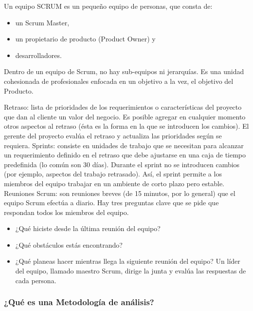 \documentclass[spanish, 12pt]{article}
\providecommand{\tightlist}{\setlength{\itemsep}{0pt}
\setlength{\parskip}{0pt}}
\begin{document}
	Un equipo SCRUM es un pequeño equipo de personas, que consta de:

	\begin{itemize}
		\tightlist

		\item un Scrum Master,

		\item un propietario de producto (Product Owner) y

		\item desarrolladores.
	\end{itemize}

	Dentro de un equipo de Scrum, no hay sub-equipos ni jerarquías. Es una unidad
	cohesionada de profesionales enfocada en un objetivo a la vez, el objetivo del
	Producto.

	Retraso: lista de prioridades de los requerimientos o características del
	proyecto que dan al cliente un valor del negocio. Es posible agregar en cualquier
	momento otros aspectos al retraso (ésta es la forma en la que se introducen
	los cambios). El gerente del proyecto evalúa el retraso y actualiza las
	prioridades según se requiera. Sprints: consiste en unidades de trabajo que se
	necesitan para alcanzar un requerimiento definido en el retraso que debe
	ajustarse en una caja de tiempo predefinida (lo común son 30 días). Durante el
	sprint no se introducen cambios (por ejemplo, aspectos del trabajo retrasado).
	Así, el sprint permite a los miembros del equipo trabajar en un ambiente de
	corto plazo pero estable. Reuniones Scrum: son reuniones breves (de 15 minutos,
	por lo general) que el equipo Scrum efectúa a diario. Hay tres preguntas clave
	que se pide que respondan todos los miembros del equipo.

	\begin{itemize}
		\tightlist

		\item ¿Qué hiciste desde la última reunión del equipo?

		\item ¿Qué obstáculos estás encontrando?

		\item ¿Qué planeas hacer mientras llega la siguiente reunión del equipo? Un
			líder del equipo, llamado maestro Scrum, dirige la junta y evalúa las
			respuestas de cada persona.
	\end{itemize}

	\subsubsection{¿Qué es una Metodología de análisis?}
	\label{quuxe9-es-una-metodologuxeda-de-anuxe1lisis}
\end{document}
